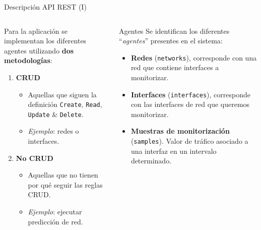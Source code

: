 \documentclass[aspectratio=169,xcolor=dvipsnames]{beamer}
\begin{document}
	\begin{frame}{Descripción API REST (I)}
		\begin{columns}
			\begin{column}{0.5\textwidth}
				Para la aplicación se implementan los diferentes agentes utilizando \textbf{dos metodologías}: \\
				
				\vspace{12px}
				
				\begin{enumerate}
					\item \textbf{CRUD} 
					\begin{itemize}
						\item Aquellas que siguen la definición \texttt{Create}, \texttt{Read}, \texttt{Update} \& \texttt{Delete}.
						
						\item \textit{Ejemplo}: redes o interfaces.
					\end{itemize}
				
					\item \textbf{No CRUD}
					\begin{itemize}
						\item Aquellas que no tienen por qué seguir las reglas CRUD.
						
						\item \textit{Ejemplo}: ejecutar predicción de red.
					\end{itemize}
				\end{enumerate}
			\end{column}
		
			\begin{column}{0.5\textwidth}
				\begin{alertblock}{Agentes}
					Se identifican los diferentes ``\textit{agentes}'' presentes en el sistema:
					
					\begin{itemize}
						\item \textbf{Redes} (\texttt{networks}), corresponde con una red que contiene interfaces a monitorizar.
						
						\item \textbf{Interfaces} (\texttt{interfaces}), corresponde con las interfaces de red que queremos monitorizar.
						
						\item \textbf{Muestras de monitorización} (\texttt{samples}). Valor de tráfico asociado a una interfaz en un intervalo determinado.
					\end{itemize}
				\end{alertblock}
			\end{column}
		\end{columns}
	\end{frame}
	
\end{document}

